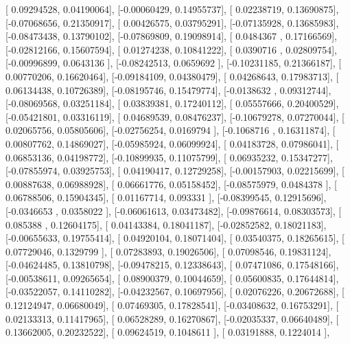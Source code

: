 \documentclass{article}
\begin{document}
       [ 0.09294528,  0.04190064],
       [-0.00060429,  0.14955737],
       [ 0.02238719,  0.13690875],
       [-0.07068656,  0.21350917],
       [ 0.00426575,  0.03795291],
       [-0.07135928,  0.13685983],
       [-0.08473438,  0.13790102],
       [-0.07869809,  0.19098914],
       [ 0.0484367 ,  0.17166569],
       [-0.02812166,  0.15607594],
       [ 0.01274238,  0.10841222],
       [ 0.0390716 ,  0.02809754],
       [-0.00996899,  0.0643136 ],
       [-0.08242513,  0.0659692 ],
       [-0.10231185,  0.21366187],
       [ 0.00770206,  0.16620464],
       [-0.09184109,  0.04380479],
       [ 0.04268643,  0.17983713],
       [ 0.06134438,  0.10726389],
       [-0.08195746,  0.15479774],
       [-0.0138632 ,  0.09312744],
       [-0.08069568,  0.03251184],
       [ 0.03839381,  0.17240112],
       [ 0.05557666,  0.20400529],
       [-0.05421801,  0.03316119],
       [ 0.04689539,  0.08476237],
       [-0.10679278,  0.07270044],
       [ 0.02065756,  0.05805606],
       [-0.02756254,  0.0169794 ],
       [-0.1068716 ,  0.16311874],
       [ 0.00807762,  0.14869027],
       [-0.05985924,  0.06099924],
       [ 0.04183728,  0.07986041],
       [ 0.06853136,  0.04198772],
       [-0.10899935,  0.11075799],
       [ 0.06935232,  0.15347277],
       [-0.07855974,  0.03925753],
       [ 0.04190417,  0.12729258],
       [-0.00157903,  0.02215699],
       [ 0.00887638,  0.06988928],
       [ 0.06661776,  0.05158452],
       [-0.08575979,  0.0484378 ],
       [ 0.06788506,  0.15904345],
       [ 0.01167714,  0.093331  ],
       [-0.08399545,  0.12915696],
       [-0.0346653 ,  0.0358022 ],
       [-0.06061613,  0.03473482],
       [-0.09876614,  0.08303573],
       [ 0.085388  ,  0.12604175],
       [ 0.04143384,  0.18041187],
       [-0.02852582,  0.18021183],
       [-0.00655633,  0.19755414],
       [ 0.04920104,  0.18071404],
       [ 0.03540375,  0.18265615],
       [ 0.07729046,  0.1329799 ],
       [ 0.07283893,  0.19026506],
       [ 0.07098546,  0.19831124],
       [-0.04624485,  0.13810798],
       [-0.09478215,  0.12338643],
       [ 0.07471086,  0.17548166],
       [-0.00538611,  0.09265654],
       [ 0.08900379,  0.10044659],
       [ 0.05600835,  0.17644814],
       [-0.03522057,  0.14110282],
       [-0.04232567,  0.10697956],
       [ 0.02076226,  0.20672688],
       [ 0.12124947,  0.06680049],
       [ 0.07469305,  0.17828541],
       [-0.03408632,  0.16753291],
       [ 0.02133313,  0.11417965],
       [ 0.06528289,  0.16270867],
       [-0.02035337,  0.06640489],
       [ 0.13662005,  0.20232522],
       [ 0.09624519,  0.1048611 ],
       [ 0.03191888,  0.1224014 ],
\end{document}
